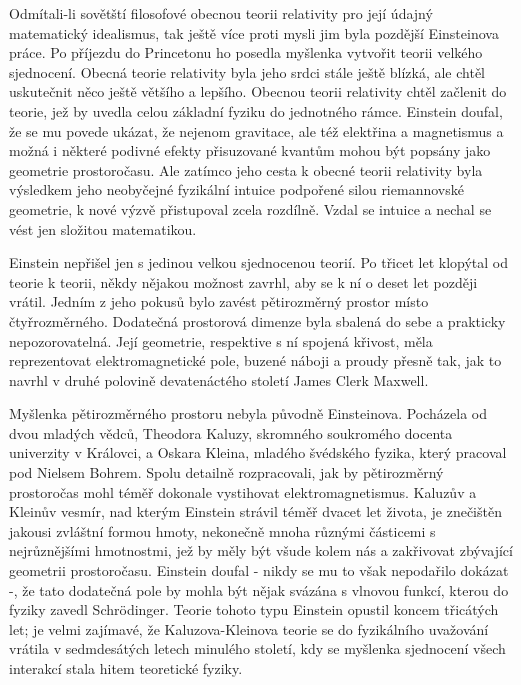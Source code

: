   Odmítali-li sovětští filosofové obecnou teorii relativity pro její údajný matematický idealismus,
  tak ještě více proti mysli jim byla pozdější Einsteinova práce. Po příjezdu do Princetonu ho
  posedla myšlenka vytvořit teorii velkého sjednocení. Obecná teorie relativity byla jeho srdci
  stále ještě blízká, ale chtěl uskutečnit něco ještě většího a lepšího. Obecnou teorii relativity
  chtěl začlenit do teorie, jež by uvedla celou základní fyziku do jednotného rámce. Einstein
  doufal, že se mu povede ukázat, že nejenom gravitace, ale též elektřina a magnetismus a možná i
  některé podivné efekty přisuzované kvantům mohou být popsány jako geometrie prostoročasu. Ale
  zatímco jeho cesta k obecné teorii relativity byla výsledkem jeho neobyčejné fyzikální intuice
  podpořené silou riemannovské geometrie, k nové výzvě přistupoval zcela rozdílně. Vzdal se intuice
  a nechal se vést jen složitou matematikou. 
  
  Einstein nepřišel jen s jedinou velkou sjednocenou teorií. Po třicet let klopýtal od teorie k
  teorii, někdy nějakou možnost zavrhl, aby se k ní o deset let později vrátil. Jedním z jeho pokusů
  bylo zavést pětirozměrný prostor místo čtyřrozměrného. Dodatečná prostorová dimenze byla sbalená
  do sebe a prakticky nepozorovatelná. Její geometrie, respektive s ní spojená křivost, měla
  reprezentovat elektromagnetické pole, buzené náboji a proudy přesně tak, jak to navrhl v druhé
  polovině devatenáctého století James Clerk Maxwell. 
  
  Myšlenka pětirozměrného prostoru nebyla původně Einsteinova. Pocházela od dvou mladých vědců,
  Theodora Kaluzy, skromného soukromého docenta univerzity v Královci, a Oskara Kleina, mladého
  švédského fyzika, který pracoval pod Nielsem Bohrem. Spolu detailně rozpracovali, jak by
  pětirozměrný prostoročas mohl téměř dokonale vystihovat elektromagnetismus. Kaluzův a Kleinův
  vesmír, nad kterým Einstein strávil téměř dvacet let života, je znečištěn jakousi zvláštní formou
  hmoty, nekonečně mnoha různými částicemi s nejrůznějšími hmotnostmi, jež by měly být všude kolem
  nás a zakřivovat zbývající geometrii prostoročasu. Einstein doufal - nikdy se mu to však
  nepodařilo dokázat -, že tato dodatečná pole by mohla být nějak svázána s vlnovou funkcí, kterou
  do fyziky zavedl Schrödinger. Teorie tohoto typu Einstein opustil koncem třicátých let; je velmi
  zajímavé, že Kaluzova-Kleinova teorie se do fyzikálního uvažování vrátila v sedmdesátých letech
  minulého století, kdy se myšlenka sjednocení všech interakcí stala hitem teoretické fyziky. 
  
